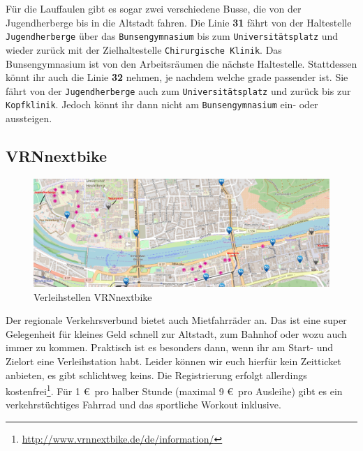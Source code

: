 Für die Lauffaulen gibt es sogar zwei verschiedene Busse, die von der Jugendherberge bis in die Altstadt fahren. Die Linie \textbf{31} fährt von der Haltestelle \texttt{Jugendherberge} über das \texttt{Bunsengymnasium} bis zum \texttt{Universitätsplatz} und wieder zurück mit der Zielhaltestelle \texttt{Chirurgische Klinik}. Das Bunsengymnasium ist von den Arbeitsräumen die nächste Haltestelle. Stattdessen könnt ihr auch die Linie \textbf{32} nehmen, je nachdem welche grade passender ist. Sie fährt von der \texttt{Jugendherberge} auch zum \texttt{Universitätsplatz} und zurück bis zur \texttt{Kopfklinik}. Jedoch könnt ihr dann nicht am \texttt{Bunsengymnasium} ein- oder aussteigen.

\subsection{VRNnextbike}

\begin{figure}[t]
  \includegraphics[width=1.0\textwidth]{chapters/heidelberg/nextbike}
  \caption*{Verleihstellen VRNnextbike}
  \label{nextbike}
\end{figure}

Der regionale Verkehrsverbund bietet auch Mietfahrräder an. Das ist eine super Gelegenheit  für kleines Geld schnell zur Altstadt, zum Bahnhof oder wozu auch immer zu kommen.  Praktisch ist es besonders dann, wenn ihr am Start- und Zielort eine Verleihstation habt. Leider können wir euch hierfür kein Zeitticket anbieten, es gibt schlichtweg keins. Die Registrierung erfolgt allerdings kostenfrei\footnote{\url{http://www.vrnnextbike.de/de/information/}}. Für 1 \euro \, pro halber Stunde (maximal 9 \euro \, pro Ausleihe) gibt es ein verkehrstüchtiges Fahrrad und das sportliche Workout inklusive.




